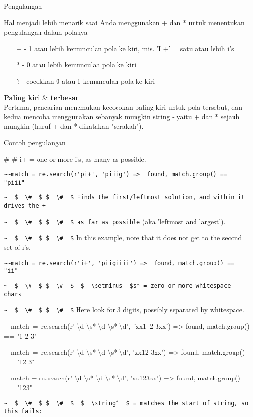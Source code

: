 \begin {enumerate}
\begin {enumerate}
Pengulangan

Hal menjadi lebih menarik saat Anda menggunakan + dan * untuk menentukan pengulangan dalam polanya

~~~ + - 1 atau lebih kemunculan pola ke kiri, mis. 'I +' = satu atau lebih i's

~~~ * - 0 atau lebih kemunculan pola ke kiri

~~~ ? - cocokkan 0 atau 1 kemunculan pola ke kiri

{\fontsize{14pt}{14pt}\selectfont \textbf{Paling kiri  $  \&  $ terbesar} \\}
Pertama, pencarian menemukan kecocokan paling kiri untuk pola tersebut, dan kedua mencoba menggunakan sebanyak mungkin string - yaitu + dan * sejauh mungkin (huruf + dan * dikatakan "serakah").

Contoh pengulangan

 $  \#  $ $  \#  $ i+ = one or more i's, as many as possible.

\verb|~~match = re.search(r'pi+', 'piiig') =>  found, match.group() == "piii"|

\verb|~  $  \#  $ $  \#  $ Finds the first/leftmost solution, and within it drives the +|

\verb|~  $  \#  $ $  \#  $ as far as possible| (aka 'leftmost and largest').

\verb|~  $  \#  $ $  \#  $| In this example, note that it does not get to the second set of i's.

\verb|~~match = re.search(r'i+', 'piigiiii') =>  found, match.group() == "ii"|

\verb|~  $  \#  $ $  \#  $  $  \setminus  $s* = zero or more whitespace chars|

\verb|~  $  \#  $ $  \#  $| Here look for 3 digits, possibly separated by whitespace.

~~match~=~re.search(r' $  \setminus  $d $  \setminus  $s* $  \setminus  $d $  \setminus  $s* $  \setminus  $d',~'xx1~2   3xx') =>  found, match.group() == "1 2   3"

~~match~=~re.search(r' $  \setminus  $d $  \setminus  $s* $  \setminus  $d $  \setminus  $s* $  \setminus  $d', 'xx12  3xx') =>  found, match.group() == "12  3"

~~match = re.search(r' $  \setminus  $d $  \setminus  $s* $  \setminus  $d $  \setminus  $s* $  \setminus  $d', 'xx123xx') =>  found, match.group() == "123"

\verb|~  $  \#  $ $  \#  $  $  \string^  $ = matches the start of string, so this fails:|


\end{enumerate}
\end{enumerate}
